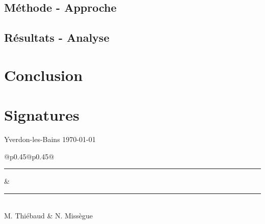 \documentclass[a4paper,12pt,oneside]{article}
\begin{document}
	\subsection{Méthode - Approche}
	
	
	\newpage
	\subsection{Résultats - Analyse}
	
	
	
	\newpage
	\section{Conclusion}
	
	

	\newpage
	\section{Signatures}
  
    Yverdon-les-Bains \today \\
    
	\vspace{2.5cm}
	\noindent
	\begin{tabular}{@{}p{0.45\textwidth}@{\hspace{0.1\textwidth}}p{0.45\textwidth}@{}}
	  \rule{\linewidth}{0.4pt} & \rule{\linewidth}{0.4pt} \\
	   M. Thiébaud & N. Missègue
	\end{tabular}
	
	\newpage

    \printbibliography[heading=bibnumbered,title={Bibliographie}]


	
\end{document}
